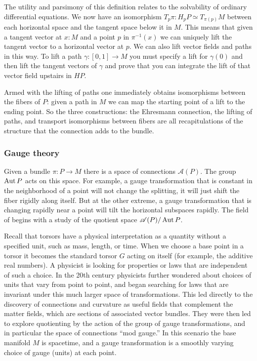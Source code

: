 The utility and parsimony of this definition relates to the solvability of ordinary differential equations. We now have an isomorphism \( T_p\pi:H_pP\simeq T_{\pi(p)}M \) between each horizontal space and the tangent space below it in \( M \). This means that given a tangent vector at \( x:M \) and a point \( p \) in \( \pi^{-1}(x) \) we can uniquely lift the tangent vector to a horizontal vector at \( p \). We can also lift vector fields and paths in this way. To lift a path \( \gamma:[0,1]\to M \) you must specify a lift for \( \gamma(0) \) and then lift the tangent vectors of \( \gamma \) and prove that you can integrate the lift of that vector field upstairs in \( HP \).

Armed with the lifting of paths one immediately obtains isomorphisms between the fibers of \( P \): given a path in \( M \) we can map the starting point of a lift to the ending point. So the three constructions: the Ehresmann connection, the lifting of paths, and transport isomorphisms between fibers are all recapitulations of the structure that the connection adds to the bundle.

\subsubsection{Gauge theory}

Given a bundle \( \pi:P\to M \) there is a space of connections \( \mathscr{A}(P) \). The group \( \operatorname{Aut} P \) acts on this space. For example, a gauge transformation that is constant in the neighborhood of a point will not change the splitting, it will just shift the fiber rigidly along itself. But at the other extreme, a gauge transformation that is changing rapidly near a point will tilt the horizontal subspaces rapidly. The field of  begins with a study of the quotient space \( \mathscr{A}(P)/\operatorname{Aut} P \).

\begin{mynote}
Recall that torsors have a physical interpretation as a quantity without a specified unit, such as mass, length, or time. When we choose a base point in a torsor it becomes the standard torsor \( G \) acting on itself (for example, the additive real numbers). A physicist is looking for properties or laws that are independent of such a choice. In the 20th century physicists further wondered about choices of units that vary from point to point, and began searching for laws that are invariant under this much larger space of transformations. This led directly to the discovery of connections and curvature as useful fields that complement the matter fields, which are sections of associated vector bundles. They were then led to explore quotienting by the action of the group of gauge transformations, and in particular the space of connections ``mod gauge.'' In this scenario the base manifold \( M \) is spacetime, and a gauge transformation is a smoothly varying choice of gauge (units) at each point.
\end{mynote}

